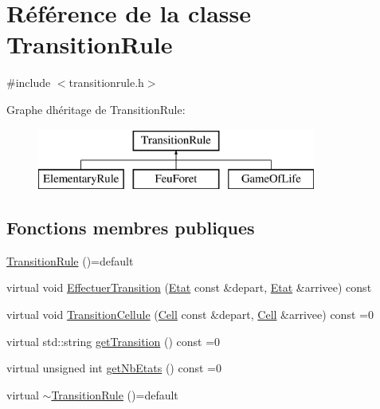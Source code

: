 \hypertarget{class_transition_rule}{}\section{Référence de la classe Transition\+Rule}
\label{class_transition_rule}


{\ttfamily \#include $<$transitionrule.\+h$>$}

Graphe d\textquotesingle{}héritage de Transition\+Rule\+:\begin{figure}[H]
\begin{center}
\leavevmode
\includegraphics[height=2.000000cm]{class_transition_rule}
\end{center}
\end{figure}
\subsection*{Fonctions membres publiques}
\begin{DoxyCompactItemize}
\item 
\mbox{\hyperlink{class_transition_rule_a591c4ae5d292f814e4a72ac8576c9a9e}{Transition\+Rule}} ()=default
\item 
virtual void \mbox{\hyperlink{class_transition_rule_a8570188a32e648ce3c08e76065f88fb7}{Effectuer\+Transition}} (\mbox{\hyperlink{class_etat}{Etat}} const \&depart, \mbox{\hyperlink{class_etat}{Etat}} \&arrivee) const
\item 
virtual void \mbox{\hyperlink{class_transition_rule_a2b82a75ef494adc91b28755d55666e7a}{Transition\+Cellule}} (\mbox{\hyperlink{class_cell}{Cell}} const \&depart, \mbox{\hyperlink{class_cell}{Cell}} \&arrivee) const =0
\item 
virtual std\+::string \mbox{\hyperlink{class_transition_rule_af537bee6cca486c754ee94855242328c}{get\+Transition}} () const =0
\item 
virtual unsigned int \mbox{\hyperlink{class_transition_rule_ad5bbcc6ef292bb079d8980f00d011a90}{get\+Nb\+Etats}} () const =0
\item 
virtual \mbox{\hyperlink{class_transition_rule_a3d373f682379d3569ddf0cd3d8819422}{$\sim$\+Transition\+Rule}} ()=default
\end{DoxyCompactItemize}


